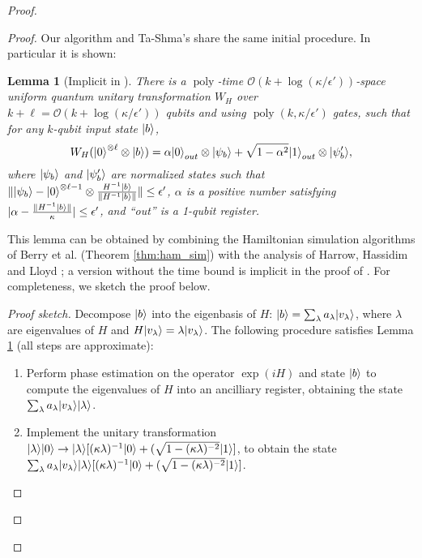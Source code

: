 \documentclass[11pt]{article}
\newtheorem{lemma}[theorem]{Lemma}
\theoremstyle{definition}
\theoremstyle{remark}
\newcommand\bigoh{\mathcal{O}}
\DeclareMathOperator{\poly}{poly}
\begin{document}
\begin{proof}
\begin{proof}
Our algorithm and Ta-Shma's share the same initial procedure.  In particular it is shown:  
\begin{lemma}[Implicit in \cite{HHL,tashma}] \label{lem: matrix inversion lemma}
There is a $\poly$-time $\bigoh (k + \log(\kappa/\epsilon'))$-space uniform quantum unitary transformation $W_H$ over $k+\ell = \bigoh (k+ \log(\kappa/\epsilon'))$ qubits and using $\poly(k,\kappa/\epsilon')$ gates, such that for any $k$-qubit input state ${\left\vert{b}\right\rangle}$,
\begin{equation}
W_H ({\left\vert{0}\right\rangle}^{\otimes \ell} \otimes {\left\vert{b}\right\rangle}) = \alpha {\left\vert{0}\right\rangle}_{out} \otimes {\left\vert{\psi_b}\right\rangle} + \sqrt{1-\alpha^2} {\left\vert{1}\right\rangle}_{out} \otimes{\left\vert{\psi'_b}\right\rangle},
\end{equation}
where ${\left\vert{\psi_b}\right\rangle}$ and ${\left\vert{\psi'_b}\right\rangle}$ are normalized states such that $\| {\left\vert{\psi_b}\right\rangle} - {\left\vert{0}\right\rangle}^{\otimes \ell-1} \otimes \frac{H^{-1}{\left\vert{b}\right\rangle}} {\|H^{-1}{\left\vert{b}\right\rangle}\|} \| \le \epsilon'$, $\alpha$ is a positive number satisfying $|\alpha - \frac{\|H^{-1}{\left\vert{b}\right\rangle}\|}{\kappa}| \le \epsilon'$, and ``out'' is a 1-qubit register.
\end{lemma}
This lemma can be obtained by combining the Hamiltonian simulation algorithms of Berry et al. (Theorem \ref{thm:ham_sim}) with the analysis of Harrow, Hassidim and Lloyd \cite{HHL}; a version without the time bound is implicit in the proof of \cite[Theorem~6.3]{tashma}. For completeness, we sketch the proof below.
\begin{proof}[Proof sketch]
Decompose ${\left\vert{b}\right\rangle}$ into the eigenbasis of $H$: ${\left\vert{b}\right\rangle} = \sum_{\lambda} a_\lambda {\left\vert{v_\lambda}\right\rangle}$, where $\lambda$ are eigenvalues of $H$ and $H{\left\vert{v_\lambda}\right\rangle} = \lambda {\left\vert{v_\lambda}\right\rangle}$. The following procedure satisfies Lemma \ref{lem: matrix inversion lemma} (all steps are approximate):
\begin{enumerate}
\item Perform phase estimation on the operator $\exp(iH)$ and state ${\left\vert{b}\right\rangle}$ to compute the eigenvalues of $H$ into an ancilliary register, obtaining the state $\sum_{\lambda} a_\lambda {\left\vert{v_\lambda}\right\rangle}{\left\vert{\lambda}\right\rangle}$.
\item Implement the unitary transformation ${\left\vert{\lambda}\right\rangle}{\left\vert{0}\right\rangle} \rightarrow {\left\vert{\lambda}\right\rangle}[(\kappa\lambda)^{-1}{\left\vert{0}\right\rangle}+(\sqrt{1-(\kappa\lambda)^{-2}}{\left\vert{1}\right\rangle}]$, to obtain the state $\sum_{\lambda} a_\lambda {\left\vert{v_\lambda}\right\rangle}{\left\vert{\lambda}\right\rangle}[(\kappa\lambda)^{-1}{\left\vert{0}\right\rangle}+(\sqrt{1-(\kappa\lambda)^{-2}}{\left\vert{1}\right\rangle}]$.

\end{enumerate}
\end{proof}
\end{proof}
\end{proof}
\end{document}
